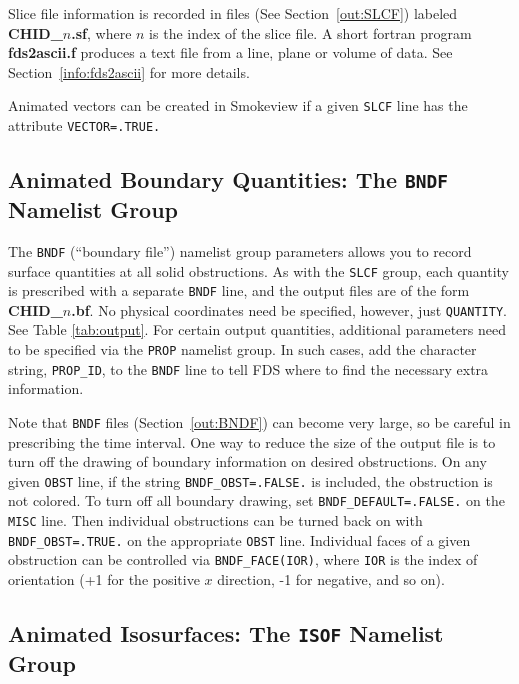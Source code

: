 \documentclass[11pt]{book}
\newcommand{\ct}{\tt\small}
\begin{document}
Slice file information is recorded in files (See Section~\ref{out:SLCF}) 
labeled {\bf CHID\_$n$.sf}, where $n$ is the index of the slice file.
A short fortran program {\bf fds2ascii.f} produces a text file from a line,
plane or volume of data. See Section~\ref{info:fds2ascii} for more details.

Animated vectors can be created in Smokeview if a given {\ct SLCF} line has the attribute {\ct VECTOR=.TRUE.}




\subsection{Animated Boundary Quantities: The \texorpdfstring{{\tt BNDF}}{BNDF} Namelist Group}
\label{info:BNDF}

The {\ct BNDF} (``boundary file'') 
 namelist group parameters allows you
to record surface quantities at all solid obstructions. As with
the {\ct SLCF} group, each quantity is prescribed with a separate
{\ct BNDF} line, and the output files are of the form {\bf CHID\_$n$.bf}.
No physical coordinates need be specified, however, just {\ct QUANTITY}.
See Table \ref{tab:output}. For certain output quantities, additional parameters need to be specified via
the {\ct PROP} namelist group. In such cases, add the character string, {\ct PROP\_ID}, to the {\ct BNDF} line
to tell FDS where to find the necessary extra information.

Note that {\ct BNDF} files (Section~\ref{out:BNDF}) can become very
large, so be careful in prescribing the time interval.
One way to reduce the size of the output file is to turn off the
drawing of boundary information on desired obstructions. On any given
{\ct OBST} line, if the string {\ct BNDF\_OBST=.FALSE.} is included,
the obstruction is not colored. To turn off all boundary drawing,
set {\ct BNDF\_DEFAULT=.FALSE.} on the {\ct MISC} line. Then individual
obstructions can be turned back on with {\ct BNDF\_OBST=.TRUE.} on
the appropriate {\ct OBST} line. Individual faces of a given obstruction can be controlled
via {\ct BNDF\_FACE(IOR)}, where {\ct IOR} is the index of orientation (+1 for the positive $x$ direction, -1 for negative, and so on).



\subsection{Animated Isosurfaces: The \texorpdfstring{{\tt ISOF}}{ISOF} Namelist Group}
\label{info:ISOF} 
\end{document}
